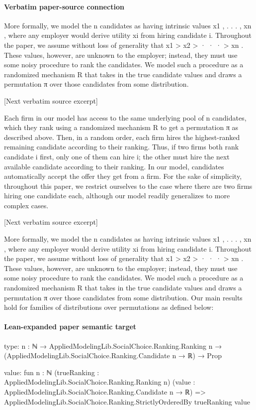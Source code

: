 \documentclass[10pt]{article}
\begin{document}
\paragraph{Verbatim paper-source connection}
\begin{ReviewVerbatim}
More formally, we model the n candidates as having intrinsic values x1 , . . . , xn , where any employer would
derive utility xi from hiring candidate i. Throughout the paper, we assume without loss of generality that
x1 > x2 > · · · > xn . These values, however, are unknown to the employer; instead, they must use some
noisy procedure to rank the candidates. We model such a procedure as a randomized mechanism R that
takes in the true candidate values and draws a permutation π over those candidates from some distribution.

[Next verbatim source excerpt]

Each firm in our model has access to the same underlying pool of n candidates, which they rank using
a randomized mechanism R to get a permutation π as described above. Then, in a random order, each
firm hires the highest-ranked remaining candidate according to their ranking. Thus, if two firms both rank
candidate i first, only one of them can hire i; the other must hire the next available candidate according to
their ranking. In our model, candidates automatically accept the offer they get from a firm. For the sake
of simplicity, throughout this paper, we restrict ourselves to the case where there are two firms hiring one
candidate each, although our model readily generalizes to more complex cases.

[Next verbatim source excerpt]

More formally, we model the n candidates as having intrinsic values x1 , . . . , xn , where any employer would
derive utility xi from hiring candidate i. Throughout the paper, we assume without loss of generality that
x1 > x2 > · · · > xn . These values, however, are unknown to the employer; instead, they must use some
noisy procedure to rank the candidates. We model such a procedure as a randomized mechanism R that
takes in the true candidate values and draws a permutation π over those candidates from some distribution.
Our main results hold for families of distributions over permutations as defined below:
\end{ReviewVerbatim}



\paragraph{Lean-expanded paper semantic target}
\begin{ReviewVerbatim}
type:
{n : ℕ} →
  AppliedModelingLib.SocialChoice.Ranking.Ranking n → (AppliedModelingLib.SocialChoice.Ranking.Candidate n → ℝ) → Prop

value:
fun {n : ℕ} (trueRanking : AppliedModelingLib.SocialChoice.Ranking.Ranking n)
    (value : AppliedModelingLib.SocialChoice.Ranking.Candidate n → ℝ) =>
  AppliedModelingLib.SocialChoice.Ranking.StrictlyOrderedBy trueRanking value
\end{ReviewVerbatim}
\end{document}
